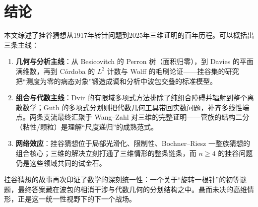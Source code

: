 \section{结论}\label{sec:conclusion}

本文综述了挂谷猜想从1917年转针问题到2025年三维证明的百年历程。可以概括出三条主线：

\begin{enumerate}[label=(\arabic*)]
    \item \textbf{几何与分析主线}：从 Besicovitch 的 Perron 树（面积归零），到 Davies 的平面满维数，再到 Córdoba 的 $L^2$ 计数与 Wolff 的毛刷论证——挂谷集的研究把“测度为零的病态对象”锻造成调和分析中波包交叠的标准模型。
    \item \textbf{组合与代数主线}：Dvir 的有限域多项式方法排除了纯组合障碍并辐射到整个离散数学；Guth 的多项式分划则把代数几何工具带回实数问题，补齐多线性端点。两条支流最终汇聚于 Wang--Zahl 对三维的完整证明——管族的结构二分（粘性/颗粒）是理解“尺度递归”的成熟范式。
    \item \textbf{网络效应}：挂谷猜想位于局部光滑化、限制性、Bochner--Riesz 一整族猜想的组合核心；三维的解决立刻打通了三维情形的整条链条，而 $n \ge 4$ 的挂谷问题仍是这些领域共同的试金石。
\end{enumerate}

挂谷猜想的故事再次印证了数学的深刻统一性：一个关于“旋转一根针”的初等谜题，最终答案藏在波包的相消干涉与代数几何的分划结构之中。悬而未决的高维情形，正是这一统一性视野下的下一个战场。
